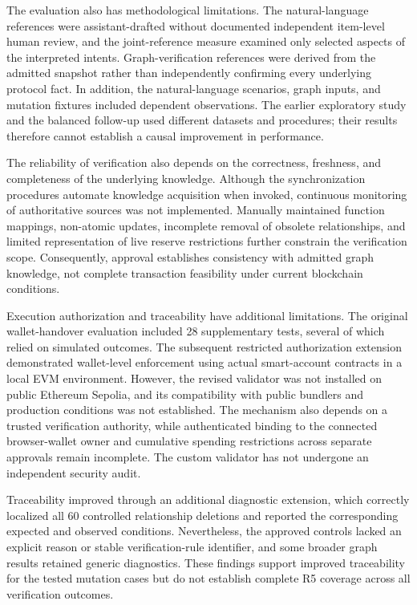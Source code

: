 The evaluation also has methodological limitations.
The natural-language references were assistant-drafted
without documented independent item-level human review,
and the joint-reference measure examined only selected
aspects of the interpreted intents. Graph-verification
references were derived from the admitted snapshot rather
than independently confirming every underlying protocol
fact. In addition, the natural-language scenarios,
graph inputs, and mutation fixtures included dependent
observations. The earlier exploratory study and the
balanced follow-up used different datasets and procedures;
their results therefore cannot establish a causal
improvement in performance.

The reliability of verification also depends on the
correctness, freshness, and completeness of the underlying
knowledge. Although the synchronization procedures
automate knowledge acquisition when invoked, continuous
monitoring of authoritative sources was not implemented.
Manually maintained function mappings, non-atomic updates,
incomplete removal of obsolete relationships, and limited
representation of live reserve restrictions further
constrain the verification scope. Consequently, approval
establishes consistency with admitted graph knowledge,
not complete transaction feasibility under current
blockchain conditions.

Execution authorization and traceability have additional
limitations. The original wallet-handover evaluation
included 28 supplementary tests, several of which relied
on simulated outcomes. The subsequent restricted
authorization extension demonstrated wallet-level
enforcement using actual smart-account contracts in a
local EVM environment. However, the revised validator
was not installed on public Ethereum Sepolia, and its
compatibility with public bundlers and production
conditions was not established. The mechanism also
depends on a trusted verification authority, while
authenticated binding to the connected browser-wallet
owner and cumulative spending restrictions across
separate approvals remain incomplete. The custom
validator has not undergone an independent security
audit.

Traceability improved through an additional diagnostic
extension, which correctly localized all 60 controlled
relationship deletions and reported the corresponding
expected and observed conditions. Nevertheless, the
approved controls lacked an explicit reason or stable
verification-rule identifier, and some broader graph
results retained generic diagnostics. These findings
support improved traceability for the tested mutation
cases but do not establish complete R5 coverage across
all verification outcomes.

